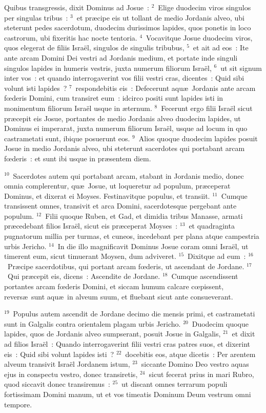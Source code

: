 \lettrine[lines=3,image=true,loversize=0.05,lraise=-0.03]{Q}{}uibus transgressis, dixit Dominus ad Josue~:
${}^{2}$~Elige duodecim viros singulos per singulas tribus~:
${}^{3}$~et pr\ae cipe eis ut tollant de medio Jordanis alveo, ubi steterunt pedes sacerdotum, duodecim durissimos lapides, quos ponetis in loco castrorum, ubi fixeritis hac nocte tentoria.
${}^{4}$~Vocavitque Josue duodecim viros, quos elegerat de filiis Isra\"el, singulos de singulis tribubus,
${}^{5}$~et ait ad eos~: Ite ante arcam Domini Dei vestri ad Jordanis medium, et portate inde singuli singulos lapides in humeris vestris, juxta numerum filiorum Isra\"el,
${}^{6}$~ut sit signum inter vos~: et quando interrogaverint vos filii vestri cras, dicentes~: Quid sibi volunt isti lapides~?
${}^{7}$~respondebitis eis~: Defecerunt aqu\ae\ Jordanis ante arcam fœderis Domini, cum transiret eum~: idcirco positi sunt lapides isti in monimentum filiorum Isra\"el usque in \ae ternum.
${}^{8}$~Fecerunt ergo filii Isra\"el sicut pr\ae cepit eis Josue, portantes de medio Jordanis alveo duodecim lapides, ut Dominus ei imperarat, juxta numerum filiorum Isra\"el, usque ad locum in quo castrametati sunt, ibique posuerunt eos.
${}^{9}$~Alios quoque duodecim lapides posuit Josue in medio Jordanis alveo, ubi steterunt sacerdotes qui portabant arcam fœderis~: et sunt ibi usque in pr\ae sentem diem.


${}^{10}$~Sacerdotes autem qui portabant arcam, stabant in Jordanis medio, donec omnia complerentur, qu\ae\ Josue, ut loqueretur ad populum, pr\ae ceperat Dominus, et dixerat ei Moyses. Festinavitque populus, et transiit.
${}^{11}$~Cumque transissent omnes, transivit et arca Domini, sacerdotesque pergebant ante populum.
${}^{12}$~Filii quoque Ruben, et Gad, et dimidia tribus Manasse, armati pr\ae cedebant filios Isra\"el, sicut eis pr\ae ceperat Moyses~:
${}^{13}$~et quadraginta pugnatorum millia per turmas, et cuneos, incedebant per plana atque campestria urbis Jericho.
${}^{14}$~In die illo magnificavit Dominus Josue coram omni Isra\"el, ut timerent eum, sicut timuerant Moysen, dum adviveret.
${}^{15}$~Dixitque ad eum~:
${}^{16}$~Pr\ae cipe sacerdotibus, qui portant arcam fœderis, ut ascendant de Jordane.
${}^{17}$~Qui pr\ae cepit eis, dicens~: Ascendite de Jordane.
${}^{18}$~Cumque ascendissent portantes arcam fœderis Domini, et siccam humum calcare cœpissent, revers\ae\ sunt aqu\ae\ in alveum suum, et fluebant sicut ante consueverant.


${}^{19}$~Populus autem ascendit de Jordane decimo die mensis primi, et castrametati sunt in Galgalis contra orientalem plagam urbis Jericho.
${}^{20}$~Duodecim quoque lapides, quos de Jordanis alveo sumpserant, posuit Josue in Galgalis,
${}^{21}$~et dixit ad filios Isra\"el~: Quando interrogaverint filii vestri cras patres suos, et dixerint eis~: Quid sibi volunt lapides isti~?
${}^{22}$~docebitis eos, atque dicetis~: Per arentem alveum transivit Isra\"el Jordanem istum,
${}^{23}$~siccante Domino Deo vestro aquas ejus in conspectu vestro, donec transiretis,
${}^{24}$~sicut fecerat prius in mari Rubro, quod siccavit donec transiremus~:
${}^{25}$~ut discant omnes terrarum populi fortissimam Domini manum, ut et vos timeatis Dominum Deum vestrum omni tempore.

